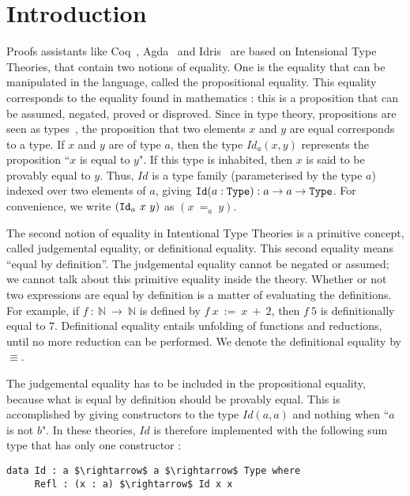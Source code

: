 \section{Introduction}

Proofs assistants like Coq~\cite{BertotC04}, Agda~\cite{DBLP:conf/tldi/Norell09} and Idris~\cite{brady2013idris} are based on Intensional Type Theories, that contain two notions of equality. One is the equality that can be manipulated in the language, called the propositional equality. This equality corresponds to the equality found in mathematics : this is a proposition that can be assumed, negated, proved or disproved. Since in type theory, propositions are seen as types~\cite{How80}, the
proposition that two elements $x$ and $y$ are equal corresponds to a type.
If $x$ and $y$ are of type $a$, then the type
$Id_a(x, y)$ represents the proposition ``$x$ is equal to $y$". If this type is
inhabited, then $x$ is said to be provably equal to $y$. Thus, $Id$ is a type family (parameterised by the type $a$) indexed over two elements of $a$, giving ${\mbox{\texttt{Id}}} (a:{\mbox{\texttt{Type}}}):a \rightarrow a \rightarrow {\mbox{\texttt{Type}}}$. For
convenience, we write $({\mbox{\texttt{Id}}}_a\ x\ y)$ as $(x\ =_a\ y)$. 

The second notion of equality in Intentional Type Theories is a primitive concept, called judgemental equality, or definitional equality. This second equality means ``equal by definition''. The judgemental equality cannot be negated or assumed; we cannot talk about this primitive equality inside the theory.
Whether or not two expressions are equal by definition is a matter of
evaluating the definitions. For example, if $f\ :\ \mathbb{N}\ \rightarrow\
\mathbb{N}$ is defined by $f\ x\ :=\ x\ +\ 2$, then $f\ 5$ is
definitionally equal to $7$. Definitional equality entails unfolding
of functions and reductions, until no more reduction can be
performed. We denote the definitional equality by $\equiv$.

The judgemental equality has to be included in the propositional equality, because what is equal by definition should be provably equal. This is accomplished by giving constructors to the type $Id(a,a)$ and nothing when ``$a$ is not $b$".
In these theories, $Id$ is therefore implemented with the following sum type that has only one constructor :

\begin{lstlisting}
data Id : a $\rightarrow$ a $\rightarrow$ Type where
     Refl : (x : a) $\rightarrow$ Id x x
\end{lstlisting}

